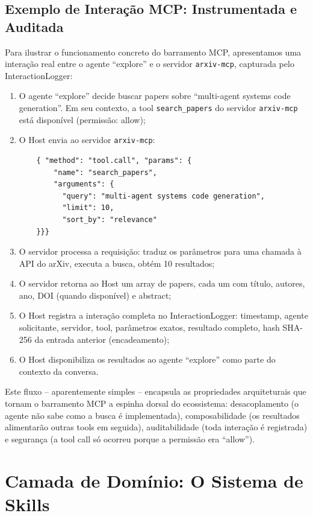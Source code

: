 \documentclass[12pt,a4paper,sumario=tradicional,openany]{abntex2}
\begin{document}
\subsection{Exemplo de Interação MCP: Instrumentada e Auditada}

Para ilustrar o funcionamento concreto do barramento MCP, apresentamos uma interação real entre o agente ``explore'' e o servidor \texttt{arxiv-mcp}, capturada pelo InteractionLogger:

\begin{enumerate}
    \item O agente ``explore'' decide buscar papers sobre ``multi-agent systems code generation''. Em seu contexto, a tool \texttt{search\_papers} do servidor \texttt{arxiv-mcp} está disponível (permissão: allow);
    \item O Host envia ao servidor \texttt{arxiv-mcp}:
    \begin{verbatim}
    { "method": "tool.call", "params": {
        "name": "search_papers",
        "arguments": {
          "query": "multi-agent systems code generation",
          "limit": 10,
          "sort_by": "relevance"
    }}}
    \end{verbatim}
    \item O servidor processa a requisição: traduz os parâmetros para uma chamada à API do arXiv, executa a busca, obtém 10 resultados;
    \item O servidor retorna ao Host um array de papers, cada um com título, autores, ano, DOI (quando disponível) e abstract;
    \item O Host registra a interação completa no InteractionLogger: timestamp, agente solicitante, servidor, tool, parâmetros exatos, resultado completo, hash SHA-256 da entrada anterior (encadeamento);
    \item O Host disponibiliza os resultados ao agente ``explore'' como parte do contexto da conversa.
\end{enumerate}

Este fluxo -- aparentemente simples -- encapsula as propriedades arquiteturais que tornam o barramento MCP a espinha dorsal do ecossistema: desacoplamento (o agente não sabe como a busca é implementada), composabilidade (os resultados alimentarão outras tools em seguida), auditabilidade (toda interação é registrada) e segurança (a tool call só ocorreu porque a permissão era ``allow'').

\section{Camada de Domínio: O Sistema de Skills}
\end{document}
